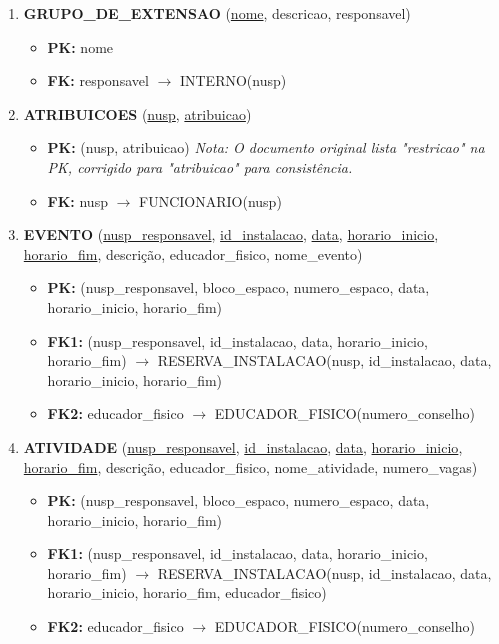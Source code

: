 \documentclass{article}
\begin{document}
\begin{enumerate}
    \item \textbf{GRUPO\_DE\_EXTENSAO} (\underline{nome}, descricao, responsavel)
        \begin{itemize}
            \item \textbf{PK:} nome
            \item \textbf{FK:} responsavel $\rightarrow$ INTERNO(nusp)
        \end{itemize}

    \item \textbf{ATRIBUICOES} (\underline{nusp}, \underline{atribuicao})
        \begin{itemize}
            \item \textbf{PK:} (nusp, atribuicao) \textit{Nota: O documento original lista "restricao" na PK, corrigido para "atribuicao" para consistência.}
            \item \textbf{FK:} nusp $\rightarrow$ FUNCIONARIO(nusp)
        \end{itemize}

    \item \textbf{EVENTO} (\underline{nusp\_responsavel}, \underline{id\_instalacao}, \underline{data}, \underline{horario\_inicio}, \underline{horario\_fim}, descrição, educador\_fisico, nome\_evento)
        \begin{itemize}
            \item \textbf{PK:} (nusp\_responsavel, bloco\_espaco, numero\_espaco, data, horario\_inicio, horario\_fim)
            \item \textbf{FK1:} (nusp\_responsavel, id\_instalacao, data, horario\_inicio, horario\_fim) $\rightarrow$ RESERVA\_INSTALACAO(nusp, id\_instalacao, data, horario\_inicio, horario\_fim)
            \item \textbf{FK2:} educador\_fisico $\rightarrow$ EDUCADOR\_FISICO(numero\_conselho)
        \end{itemize}

    \item \textbf{ATIVIDADE} (\underline{nusp\_responsavel}, \underline{id\_instalacao}, \underline{data}, \underline{horario\_inicio}, \underline{horario\_fim}, descrição, educador\_fisico, nome\_atividade, numero\_vagas)
        \begin{itemize}
            \item \textbf{PK:} (nusp\_responsavel, bloco\_espaco, numero\_espaco, data, horario\_inicio, horario\_fim)
            \item \textbf{FK1:} (nusp\_responsavel, id\_instalacao, data, horario\_inicio, horario\_fim) $\rightarrow$ RESERVA\_INSTALACAO(nusp, id\_instalacao, data, horario\_inicio, horario\_fim, educador\_fisico)
            \item \textbf{FK2:} educador\_fisico $\rightarrow$ EDUCADOR\_FISICO(numero\_conselho)
        \end{itemize}


\end{enumerate}
\end{document}
